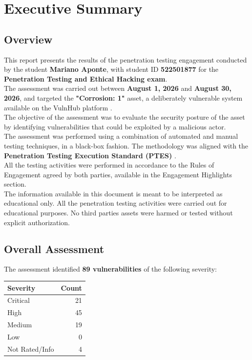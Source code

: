 \chapter{Executive Summary}

\section{Overview}
This report presents the results of the penetration testing engagement conducted by the student \textbf{Mariano Aponte}, with student ID \textbf{522501877} for the \textbf{Penetration Testing and Ethical Hacking exam}. 
\\

The assessment was carried out between \textbf{August 1, 2026} and \textbf{August 30, 2026}, and targeted the \textbf{"Corrosion: 1"} asset, a deliberately vulnerable system available on the VulnHub platform \cite{vulnhubCorrosion}.
\\

The objective of the assessment was to evaluate the security posture of the asset by identifying vulnerabilities that could be exploited by a malicious actor.
\\

The assessment was performed using a combination of automated and manual testing techniques, in a black-box fashion. The methodology was aligned with the \textbf{Penetration Testing Execution Standard (PTES)} \cite{ptes}. 
\\

All the testing activities were performed in accordance to the Rules of Engagement agreed by both parties, available in the Engagement Highlights section.
\\

The information available in this document is meant to be interpreted as educational only. All the penetration testing activities were carried out for educational purposes. No third parties assets were harmed or tested without explicit authorization.
\\

\section{Overall Assessment}

The assessment identified \textbf{89 vulnerabilities} of the following severity:
\\

\begin{center}
	\begin{tabular}{lr}
		\toprule
		\textbf{Severity} & \textbf{Count} \\
		\midrule
		Critical & 21 \\
		High & 45 \\
		Medium & 19 \\
		Low & 0 \\
		Not Rated/Info & 4 \\
		\bottomrule
	\end{tabular}
\end{center}


